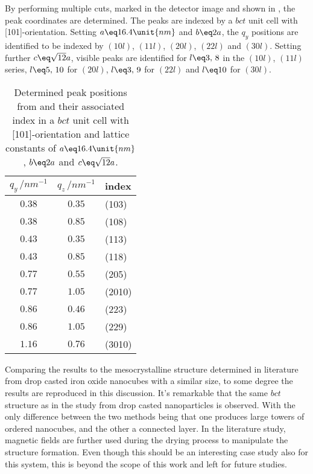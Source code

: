 \documentclass[\main/dresen_thesis.tex]{subfiles}
\begin{document}
  By performing multiple cuts, marked in the detector image and shown in , the peak coordinates are determined.
  The peaks are indexed by a $bct$ unit cell with [101]-orientation.
  Setting $a \eq 16.4 \unit{nm}$ and $b \eq 2a$, the $q_y$ positions are identified to be indexed by $(10l)$, $(11l)$, $(20l)$, $(22l)$ and $(30l)$.
  Setting further $c \eq \sqrt{12} a$, visible peaks are identified for $l\eq 3,\, 8$ in the $(10l)$, $(11l)$ series, $l \eq 5, \, 10$ for $(20l)$, $l \eq 3,\, 9$ for $(22l)$ and $l\eq 10$ for $(30l)$.

  \begin{table}[!htbp]
    \centering
    \caption{\label{tab:colloidalCrystals:gisaxs:peaks}Determined peak positions from  and their associated index in a $bct$ unit cell with [101]-orientation and lattice constants of $a \eq 16.4 \unit{nm}$, $b \eq 2a$ and $c \eq \sqrt{12}a$.}
    \begin{tabular}{ c | c | l }
      $q_y\,/ \unit{nm^{-1}}$ & $q_z\, / \unit{nm^{-1}}$ & index \\
      \hline
      $0.38$      & $0.35$  & (103)\\
      $0.38$      & $0.85$  & (108)\\
      $0.43$      & $0.35$  & (113)\\
      $0.43$      & $0.85$  & (118)\\
      $0.77$      & $0.55$  & (205)\\
      $0.77$      & $1.05$  & (2010)\\
      $0.86$      & $0.46$  & (223)\\
      $0.86$      & $1.05$  & (229)\\
      $1.16$      & $0.76$  & (3010)\\
      \hline
    \end{tabular}
  \end{table}

  Comparing the results to the mesocrystalline structure determined in literature \cite{Wetterskog_2016_Tunin} from drop casted iron oxide nanocubes with a similar size, to some degree the results are reproduced in this discussion.
  It's remarkable that the same $bct$ structure as in the study from drop casted nanoparticles is observed.
  With the only difference between the two methods being that one produces large towers of ordered nanocubes, and the other a connected layer.
  In the literature study, magnetic fields are further used during the drying process to manipulate the structure formation.
  Even though this should be an interesting case study also for this system, this is beyond the scope of this work and left for future studies.
\end{document}
